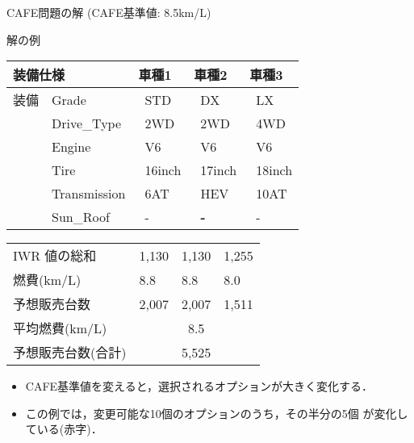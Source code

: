\documentclass[dvipdfmx, 11pt]{beamer}
\begin{document}
\begin{frame}{CAFE問題の解 {\normalsize (CAFE基準値: 8.5km/L)}}\small
 \begin{exampleblock}{解の例}
  \centering
  \renewcommand{\arraystretch}{0.9}
  \begin{tabular}{p{10mm}|p{25mm}|p{15mm}|p{15mm}|p{15mm}} 
   \multicolumn{2}{l|}{装備仕様}  & 車種1 & 車種2 & 車種3 \\\hline
   装備 & Grade  & \ STD & \ DX  & \ LX\\
   &Drive\_Type  & \ 2WD    & \ 2WD    & \ \alert{4WD}\\
   &Engine	     & \ \alert{V6}      & \ V6     & \ V6\\
   &Tire	     & \ 16inch & \ 17inch & \ 18inch\\
   &Transmission & \ \alert{6AT}     & \ \alert{HEV}     & \ 10AT\\
   &Sun\_Roof    & \ -               & \ \alert{\bf -}   & \ -  
  \end{tabular}
 \end{exampleblock}
  
 \begin{block}{}
  \centering
  \renewcommand{\arraystretch}{0.9}
  \begin{tabular}{p{38mm}|p{15mm}|p{15mm}|p{15mm}} 
   IWR 値の総和           & 1,130  & 1,130   & 1,255 \\ %
   燃費(km/L)      & 8.8  & 8.8     & 8.0 \\ %
   予想販売台数    & 2,007   & 2,007   & 1,511  \\ \hline
   平均燃費(km/L)  & \multicolumn{3}{c}{8.5} \\ 
   予想販売台数(合計)  & \multicolumn{3}{c}{5,525} 
  \end{tabular}
 \end{block}

 \vfill
 \begin{itemize}
 \item CAFE基準値を変えると，選択されるオプションが大きく変化する．
 \item この例では，変更可能な10個のオプションのうち，その半分の5個
   が変化している(赤字)．
 \end{itemize}
\end{frame}
\end{document}
